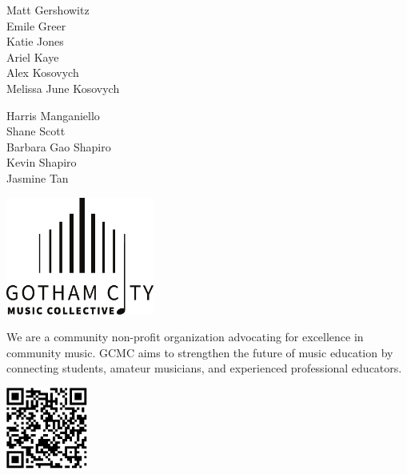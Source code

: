 \documentclass{article}[10pt]
\newcommand{\logo}{
        {\includegraphics[width=0.365\textwidth]{../../graphic_design_assets/bw_logo_full}}
}
\newcommand{\tunedspace}{\vspace{0.2in}}
\begin{document}
\begin{center}
{\begin{multicols*}{3}
\begin{center}
\begin{small}
                        Matt Gershowitz \\
                        Emile Greer \\
                        Katie Jones \\
                        Ariel Kaye \\
                        Alex Kosovych \\
                        {Melissa June Kosovych}
                        \vfill\null
                        \columnbreak

                        Harris Manganiello \\
                        Shane Scott \\
                        {Barbara Gao Shapiro} \\
                        Kevin Shapiro \\
                        Jasmine Tan
                    \end{small}
                \end{center}
            \end{multicols*}
        }

        \pagebreak


        {\logo}

        \tunedspace

        \begin{minipage}{4in}


            \begin{small}
                We are a community non-profit organization advocating for excellence in community music.
                GCMC aims to strengthen the future of music education by connecting students, amateur musicians, and experienced professional educators.
            \end{small}

            \begin{center}
            {\textbf{}}

                \vspace{0.1in}

                {\includegraphics[width=0.2\textwidth]{../../graphic_design_assets/gotham_city_music_collective_program}}


\end{center}
\end{minipage}
\end{center}
\end{document}
